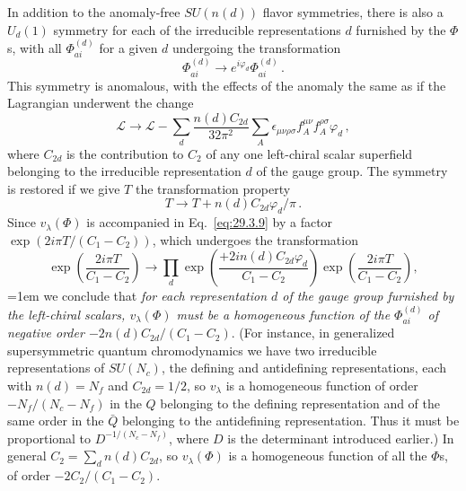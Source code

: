 In addition to the anomaly-free \(SU(n(d))\) flavor symmetries, there is
also a \(U_d(1)\) symmetry for each of the irreducible representations
\(d\) furnished by the \(\Phi\)s, with all \(\Phi_{ai}^{(d)}\) for a
given \(d\) undergoing the transformation
\begin{equation}
  \Phi_{ai}^{(d)}
  \longrightarrow
  e^{i\varphi_d}\Phi_{ai}^{(d)}\,.
  \tag{29.3.17}\label{eq:29.3.17}
\end{equation}
This symmetry is anomalous, with the effects of the anomaly the same as if
the Lagrangian underwent the change
\begin{equation}
  \mathcal{L}
  \longrightarrow
  \mathcal{L}
  -\sum_d\frac{n(d)C_{2d}}{32\pi^2}
  \sum_A\epsilon_{\mu\nu\rho\sigma}
  f_A^{\mu\nu}f_A^{\rho\sigma}\varphi_d\,,
  \tag{29.3.18}\label{eq:29.3.18}
\end{equation}
where \(C_{2d}\) is the contribution to \(C_2\) of any one left-chiral
scalar superfield belonging to the irreducible representation \(d\) of the
gauge group. The symmetry is restored if we give \(T\) the transformation
property
\begin{equation}
  T\longrightarrow T+n(d)C_{2d}\varphi_d/\pi\,.
  \tag{29.3.19}\label{eq:29.3.19}
\end{equation}
Since \(v_\lambda(\Phi)\) is accompanied in Eq.~\eqref{eq:29.3.9} by a
factor \(\exp(2i\pi T/(C_1-C_2))\), which undergoes the transformation
\begin{equation}
  \exp\left(\frac{2i\pi T}{C_1-C_2}\right)
  \longrightarrow
  \prod_d
  \exp\left(\frac{+2i n(d)C_{2d}\varphi_d}{C_1-C_2}\right)
  \exp\left(\frac{2i\pi T}{C_1-C_2}\right),
  \tag{29.3.20}\label{eq:29.3.20}
\end{equation}
\begingroup
\emergencystretch=1em
we conclude that \emph{for each representation \(d\) of the gauge group
furnished by the left-chiral scalars, \(v_\lambda(\Phi)\) must be a
homogeneous function of the \(\Phi_{ai}^{(d)}\) of negative order
\(-2n(d)C_{2d}/(C_1-C_2)\)}. (For instance, in generalized supersymmetric
quantum chromodynamics we have two irreducible representations of
\(SU(N_c)\), the defining and antidefining representations, each with
\(n(d)=N_f\) and \(C_{2d}=1/2\), so \(v_\lambda\) is a homogeneous
function of order \(-N_f/(N_c-N_f)\) in the \(Q\) belonging to the
defining representation and of the same order in the \(\bar Q\) belonging
to the antidefining representation. Thus it must be proportional to
\(D^{-1/(N_c-N_f)}\), where \(D\) is the determinant introduced earlier.)
In general \(C_2=\sum_d n(d)C_{2d}\), so \(v_\lambda(\Phi)\) is a
homogeneous function of all the \(\Phi\)s, of order
\(-2C_2/(C_1-C_2)\).
\par
\endgroup

